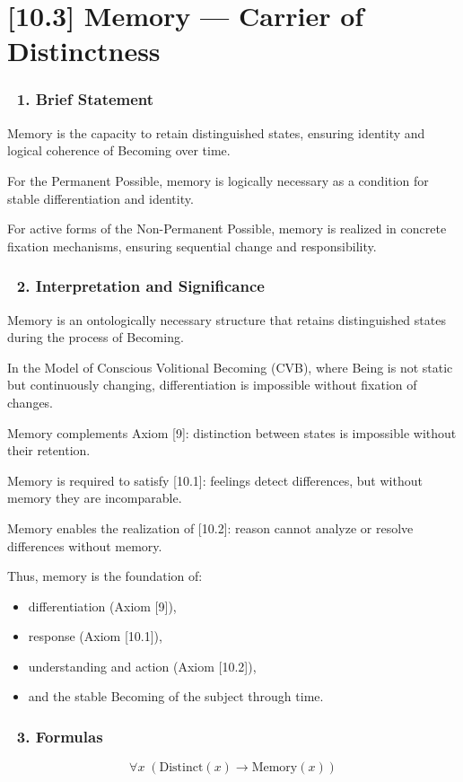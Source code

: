 \documentclass[12pt]{article}
\begin{document}
\section*{[10.3] Memory — Carrier of Distinctness}

\subsubsection*{🔹 1. Brief Statement}
Memory is the capacity to retain distinguished states, ensuring identity and logical coherence of Becoming over time.

For the Permanent Possible, memory is logically necessary as a condition for stable differentiation and identity.

For active forms of the Non-Permanent Possible, memory is realized in concrete fixation mechanisms, ensuring sequential change and responsibility.

\subsubsection*{🔹 2. Interpretation and Significance}
Memory is an ontologically necessary structure that retains distinguished states during the process of Becoming.

In the Model of Conscious Volitional Becoming (CVB), where Being is not static but continuously changing, differentiation is impossible without fixation of changes.

Memory complements Axiom [9]: distinction between states is impossible without their retention.

Memory is required to satisfy [10.1]: feelings detect differences, but without memory they are incomparable.

Memory enables the realization of [10.2]: reason cannot analyze or resolve differences without memory.

Thus, memory is the foundation of:
\begin{itemize}
\item differentiation (Axiom [9]),
\item response (Axiom [10.1]),
\item understanding and action (Axiom [10.2]),
\item and the stable Becoming of the subject through time.
\end{itemize}

\subsubsection*{🔹 3. Formulas}
\[
\forall x\; (\text{Distinct}(x) \rightarrow \text{Memory}(x))
\]
\end{document}
